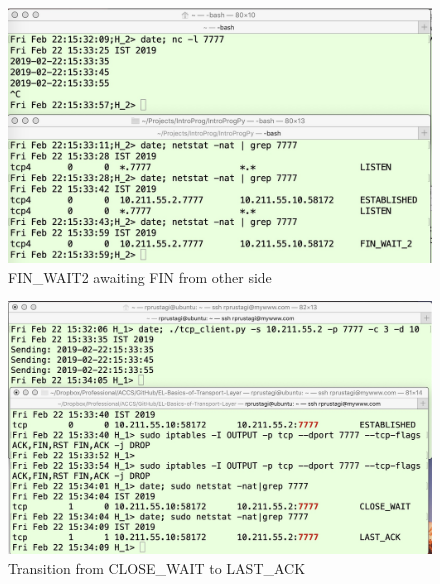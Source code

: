 \begin{figure}[!htb]
\centering
\includegraphics[scale=.22]{src/Figures/chap3/13.jpg}
\caption{FIN\_WAIT2 awaiting FIN from other side}\label{chap3-fig13}
\end{figure}

\begin{figure}[!htb]
\centering
\includegraphics[scale=.21]{src/Figures/chap3/14.jpg}
\caption{Transition from CLOSE\_WAIT to LAST\_ACK}\label{chap3-fig14}
\end{figure}

